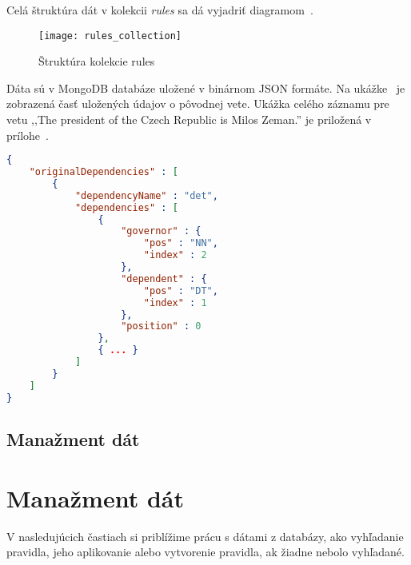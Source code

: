 Celá štruktúra dát v kolekcii \textit{rules} sa dá vyjadriť diagramom~.

\begin{figure}[H]
	\begin{center}\texttt{[image: rules\_collection]}\end{center}
	\caption[Štruktúra kolekcie rules]{Štruktúra kolekcie rules}\label{fig:rules_collection_structure}
\end{figure}

Dáta sú v MongoDB databáze uložené v binárnom JSON formáte. Na ukážke~ je zobrazená časť uložených údajov o pôvodnej vete. Ukážka celého záznamu pre vetu ,,The president of the Czech Republic is Milos Zeman.'' je priložená v prílohe~.
\\
\begin{lstlisting}[language = json, caption={Ukážka dát kolekcie rules}, label = {code:collection_rules_data_example}]
{  
	"originalDependencies" : [  
		{  
			"dependencyName" : "det",
			"dependencies" : [  
				{  
					"governor" : {  
						"pos" : "NN",
						"index" : 2
					},
					"dependent" : {  
						"pos" : "DT",
						"index" : 1
					},
					"position" : 0
				},
				{ ... }
			]
		}
	]
}
\end{lstlisting}


%
%
{
	\subsection{Manažment dát}
}
{
	\section{Manažment dát}
}
\label{subsection:data_management}
V nasledujúcich častiach si priblížime prácu s dátami z databázy, ako vyhľadanie pravidla, jeho aplikovanie alebo vytvorenie pravidla, ak žiadne nebolo vyhľadané.

